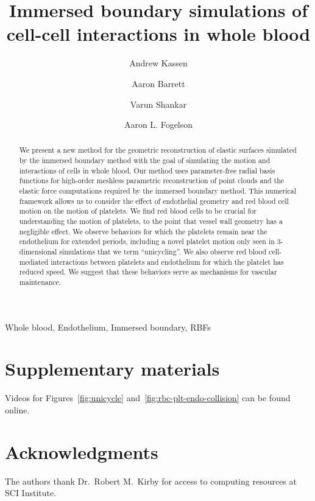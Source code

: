 \documentclass[1p,preprint,fleqn,number,sort&compress,times]{elsarticle}
\begin{document}
\begin{frontmatter}

\title{Immersed boundary simulations of cell-cell interactions in whole blood}

\author[1]{Andrew Kassen}  
\author[1]{Aaron Barrett}               
\author[2]{Varun Shankar}               
\author[1]{Aaron L. Fogelson}  

\address[1]{Department of Mathematics, University of Utah, Salt Lake City, UT 84112, USA}
\address[2]{School of Computing, University of Utah, Salt Lake City, UT 84112, USA}
\address[3]{Department of Bioengineering, University of Utah, Salt Lake City, UT 84112, USA}


\begin{abstract}
We present a new method for the geometric reconstruction of elastic surfaces simulated by the immersed boundary method with the goal of simulating the motion and interactions of cells in whole blood. Our method uses parameter-free radial basis functions for high-order meshless parametric reconstruction of point clouds and the elastic force computations required by the immersed boundary method. This numerical framework allows us to consider the effect of endothelial geometry and red blood cell motion on the motion of platelets. We find red blood cells to be crucial for understanding the motion of platelets, to the point that vessel wall geometry has a negligible effect. We observe behaviors for which the platelets remain near the endothelium for extended periods, including a novel platelet motion only seen in 3-dimensional simulations that we term ``unicycling''. We also observe red blood cell-mediated interactions between platelets and endothelium for which the platelet has reduced speed. We suggest that these behaviors serve as mechanisms for vascular maintenance.
\end{abstract}

\begin{keyword}
    Whole blood,
    Endothelium,
    Immersed boundary,
    RBFs
\end{keyword}

\end{frontmatter}





\appendix
\makeatletter
\gdef\thesubsection{\@Alph\c@section.\the\value{subsection}}%
\makeatother


\section{Supplementary materials}\label{sec:supp}
Videos for Figures~\ref{fig:unicycle} and~\ref{fig:rbc-plt-endo-collision} can be found
online.

\section*{Acknowledgments}
The authors thank Dr.\ Robert M.\ Kirby for access to computing resources at SCI
Institute.


\end{document}
